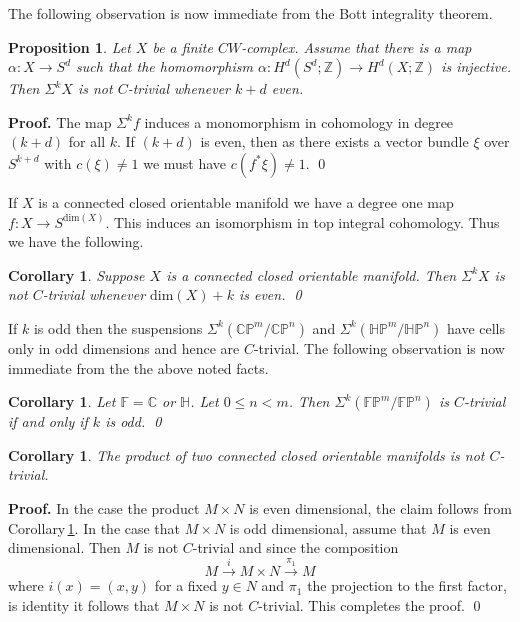 \documentclass[12pt,reqno]{amsart}
\numberwithin{equation}{subsection}
\newtheorem{Prop}[subsection]{Proposition}
\newtheorem{Cor}[subsection]{Corollary}
\theoremstyle{definition}
\begin{document}
The following observation is now immediate from the Bott integrality theorem. 

\begin{Prop}\label{firstcor}
Let $X$ be a finite $CW$-complex. Assume that there is a map $\alpha:X\longrightarrow S^d$ such that the homomorphism 
$\alpha:H^d(S^d;\mathbb Z)\longrightarrow H^d(X;\mathbb Z)$ is injective. Then $\Sigma^kX$ is not $C$-trivial whenever $k+d$ even. 
\end{Prop}
{\bf Proof.} The map $\Sigma^kf$ induces a monomorphism in cohomology in degree $(k+d)$ for all $k$. If $(k+d)$ is even, then as there exists a vector bundle $\xi$ over $S^{k+d}$ with $c(\xi)\neq 1$ we must have $c(f^*\xi)\neq 1$. \qed

If $X$ is a connected closed orientable manifold we have a degree one map $f:X\longrightarrow S^{\mathrm{dim}(X)}$. This induces an isomorphism in top integral cohomology. Thus we have the following. 

\begin{Cor}\label{secondcor}
Suppose $X$ is a connected closed orientable manifold. Then $\Sigma^k X$ is not $C$-trivial whenever $\mathrm{dim}(X)+k$ is even. \qed
\end{Cor}

If $k$ is odd then the suspensions $\Sigma^k (\mathbb C\mathbb P^m/\mathbb C\mathbb P^n)$  and $\Sigma^k (\mathbb H\mathbb P^m/\mathbb H\mathbb P^n)$ have cells only in odd dimensions and hence are $C$-trivial. The following observation is now immediate from the the above noted facts.  

\begin{Cor}\label{complex}
Let $\mathbb F= \mathbb C$ or $\mathbb H$. Let $0\leq n<m$. Then $\Sigma^k(\mathbb F\mathbb P^m/\mathbb F\mathbb P^n)$ is $C$-trivial if and only if $k$ is odd. \qed
\end{Cor}

\begin{Cor}
The product of two connected closed orientable manifolds is not $C$-trivial.
\end{Cor}
{\bf Proof.} In the case the product $M\times N$ is even dimensional, the claim follows from Corollary\,\ref{secondcor}. In the case that $M\times N$ is odd dimensional, assume that $M$ is even dimensional. Then $M$ is not $C$-trivial and since the composition  
$$M\stackrel{i}\longrightarrow M\times N\stackrel{\pi_1}{\longrightarrow} M$$
where $i(x)=(x,y)$ for a fixed $y\in N$ and $\pi_1$ the projection to the first factor, is identity it follows that $M\times N$ is not $C$-trivial. This completes the proof. \qed
\end{document}

